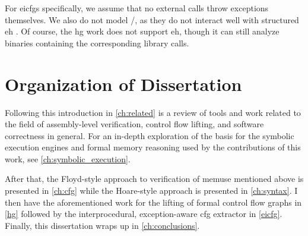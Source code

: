 For \glspl{eicfg} specifically, we assume that no external calls throw exceptions themselves.
We also do not model /, as they do not interact well with structured \gls{eh} \autocite{using-setjmp-and-longjmp}.
Of course, the \gls{hg} work does not support \gls{eh}, though it can still analyze binaries containing the corresponding library calls.


\section{Organization of Dissertation}
Following this introduction in \cref{ch:related} is a review of tools and work related to the field of assembly-level verification, control flow lifting, and software correctness in general.
For an in-depth exploration of the basis for the symbolic execution engines and formal memory reasoning used by the contributions of this work,
see \cref{ch:symbolic_execution}.

After that, the Floyd-style approach to verification of \gls{memuse} mentioned above is presented in \cref{ch:cfg} while the Hoare-style approach is presented in \cref{ch:syntax}.
I then have the aforementioned work for the lifting of formal control flow graphs in \cref{hg}
followed by the interprocedural, exception-aware \gls{cfg} extractor in \cref{eicfg}.
Finally, this dissertation wraps up in \cref{ch:conclusions}.
